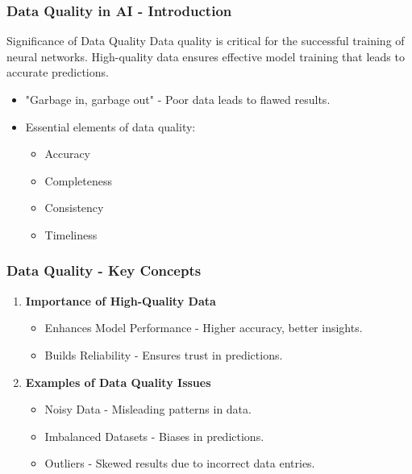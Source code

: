 \documentclass[aspectratio=169]{beamer}
\begin{document}
\begin{frame}[fragile]
    \frametitle{Data Quality in AI - Introduction}
    \begin{block}{Significance of Data Quality}
        Data quality is critical for the successful training of neural networks. High-quality data ensures effective model training that leads to accurate predictions.
    \end{block}
    \begin{itemize}
        \item "Garbage in, garbage out" - Poor data leads to flawed results.
        \item Essential elements of data quality:
        \begin{itemize}
            \item Accuracy
            \item Completeness
            \item Consistency
            \item Timeliness
        \end{itemize}
    \end{itemize}
\end{frame}

\begin{frame}[fragile]
    \frametitle{Data Quality - Key Concepts}
    \begin{enumerate}
        \item \textbf{Importance of High-Quality Data}
        \begin{itemize}
            \item Enhances Model Performance - Higher accuracy, better insights.
            \item Builds Reliability - Ensures trust in predictions.
        \end{itemize}
        
        \item \textbf{Examples of Data Quality Issues}
        \begin{itemize}
            \item Noisy Data - Misleading patterns in data.
            \item Imbalanced Datasets - Biases in predictions.
            \item Outliers - Skewed results due to incorrect data entries.
        \end{itemize}
    \end{enumerate}
\end{frame}
\end{document}
